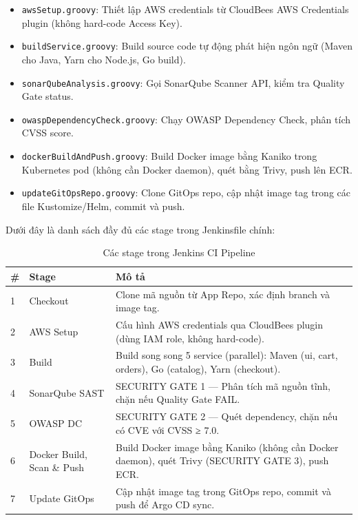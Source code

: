 \documentclass[13pt,a4paper,twoside]{extarticle}
\begin{document}
\begin{itemize}[leftmargin=*,nosep]
  \item \texttt{awsSetup.groovy}: Thiết lập AWS credentials từ CloudBees AWS Credentials plugin (không hard-code Access Key).
  \item \texttt{buildService.groovy}: Build source code tự động phát hiện ngôn ngữ (Maven cho Java, Yarn cho Node.js, Go build).
  \item \texttt{sonarQubeAnalysis.groovy}: Gọi SonarQube Scanner API, kiểm tra Quality Gate status.
  \item \texttt{owaspDependencyCheck.groovy}: Chạy OWASP Dependency Check, phân tích CVSS score.
  \item \texttt{dockerBuildAndPush.groovy}: Build Docker image bằng Kaniko trong Kubernetes pod (không cần Docker daemon), quét bằng Trivy, push lên ECR.
  \item \texttt{updateGitOpsRepo.groovy}: Clone GitOps repo, cập nhật image tag trong các file Kustomize/Helm, commit và push.
\end{itemize}

Dưới đây là danh sách đầy đủ các stage trong Jenkinsfile chính:

\begin{table}[H]
\centering
\begin{tabular}{@{}p{1cm} p{4.5cm} p{8.5cm}@{}}
\toprule
\textbf{\#} & \textbf{Stage} & \textbf{Mô tả} \\
\midrule
1 & Checkout      & Clone mã nguồn từ App Repo, xác định branch và image tag. \\
2 & AWS Setup     & Cấu hình AWS credentials qua CloudBees plugin (dùng IAM role, không hard-code). \\
3 & Build         & Build song song 5 service (parallel): Maven (ui, cart, orders), Go (catalog), Yarn (checkout). \\
4 & SonarQube SAST & SECURITY GATE 1 --- Phân tích mã nguồn tĩnh, chặn nếu Quality Gate FAIL. \\
5 & OWASP DC      & SECURITY GATE 2 --- Quét dependency, chặn nếu có CVE với CVSS ≥ 7.0. \\
6 & Docker Build, Scan \& Push & Build Docker image bằng Kaniko (không cần Docker daemon), quét Trivy (SECURITY GATE 3), push ECR. \\
7 & Update GitOps & Cập nhật image tag trong GitOps repo, commit và push để Argo CD sync. \\
\bottomrule
\end{tabular}
\caption{Các stage trong Jenkins CI Pipeline}
\label{tab:jenkins-stages}
\end{table}
\end{document}
